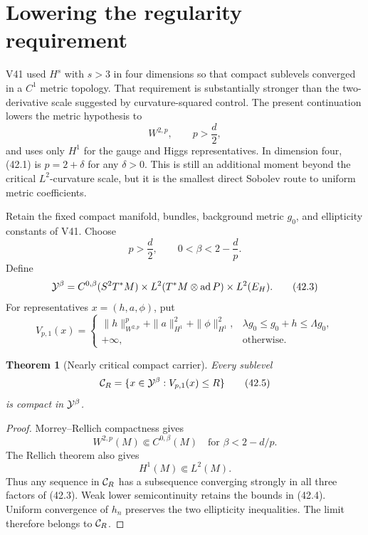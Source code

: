 \documentclass[11pt]{article}
\newtheorem{theorem}{Theorem}[section]
\theoremstyle{remark}
\begin{document}
\section{Lowering the regularity requirement}

V41 used \(H^s\) with \(s>3\) in four dimensions so that compact
sublevels converged in a \(C^1\) metric topology.  That requirement
is substantially stronger than the two-derivative scale suggested
by curvature-squared control.  The present continuation lowers the
metric hypothesis to
\[
 W^{2,p},\qquad p>\frac d2,                              \tag{42.1}
\]
and uses only \(H^1\) for the gauge and Higgs representatives.
In dimension four, (42.1) is \(p=2+\delta\) for any
\(\delta>0\).  This is still an additional moment beyond the
critical \(L^2\)-curvature scale, but it is the smallest direct
Sobolev route to uniform metric coefficients.

Retain the fixed compact manifold, bundles, background metric
\(g_0\), and ellipticity constants of V41.  Choose
\[
 p>\frac d2,\qquad
 0<\beta<2-\frac dp.                                    \tag{42.2}
\]
Define
\[
 {\cal Y}^{\beta}=
 C^{0,\beta}(S^2T^*M)\times
 L^2(T^*M\otimes\operatorname{ad}P)\times L^2(E_H).
                                                               \tag{42.3}
\]
For representatives \(x=(h,a,\phi)\), put
\[
 V_{p,1}(x)=
 \begin{cases}
 \|h\|_{W^{2,p}}^p+\|a\|_{H^1}^2+\|\phi\|_{H^1}^2,
 &\lambda g_0\leq g_0+h\leq\Lambda g_0,\\
 +\infty,&\text{otherwise}.
 \end{cases}                                             \tag{42.4}
\]

\begin{theorem}[Nearly critical compact carrier]
\label{thm:v15v42-compact}
Every sublevel
\[
 {\cal C}_R=\{x\in{\cal Y}^{\beta}:V_{p,1}(x)\leq R\}    \tag{42.5}
\]
is compact in \({\cal Y}^{\beta}\).
\end{theorem}

\begin{proof}
Morrey--Rellich compactness gives
\[
 W^{2,p}(M)\Subset C^{0,\beta}(M)
 \quad\text{for }\beta<2-d/p.                           \tag{42.6}
\]
The Rellich theorem also gives
\[
 H^1(M)\Subset L^2(M).                                  \tag{42.7}
\]
Thus any sequence in \({\cal C}_R\) has a subsequence converging
strongly in all three factors of (42.3).  Weak lower
semicontinuity retains the bounds in (42.4).  Uniform convergence
of \(h_n\) preserves the two ellipticity inequalities.  The limit
therefore belongs to \({\cal C}_R\).
\end{proof}
\end{document}
